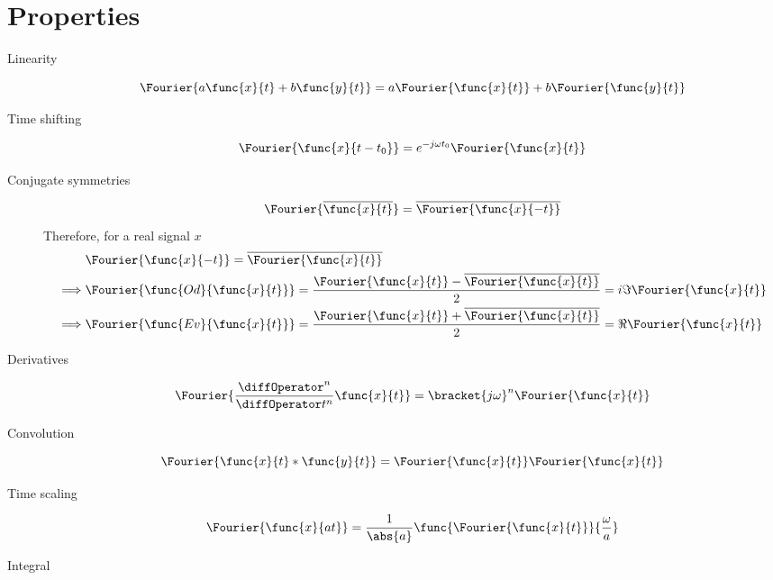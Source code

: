 \section{Properties}
\begin{description}
    \item[Linearity]
    \begin{equation*}
        \Fourier{a \func{x}{t} + b \func{y}{t}} = a \Fourier{\func{x}{t}} + b \Fourier{\func{y}{t}}
    \end{equation*}
    \item[Time shifting]
    \begin{equation*}
        \Fourier{\func{x}{t - t_0}} = e^{-j\omega t_0} \Fourier{\func{x}{t}}
    \end{equation*}
    \item[Conjugate symmetries]
    \begin{equation*}
        \Fourier{\overline{\func{x}{t}}} = \overline{\Fourier{\func{x}{-t}}}    
    \end{equation*}
    Therefore, for a real signal \(x\) 
    \begin{align*}
        & \Fourier{\func{x}{-t}} = \overline{\Fourier{\func{x}{t}}}\\
        \implies & \Fourier{\func{Od}{\func{x}{t}}} = \dfrac{\Fourier{\func{x}{t}} - \overline{\Fourier{\func{x}{t}}}}{2} = i \Im \Fourier{\func{x}{t}}\\
        \implies &  \Fourier{\func{Ev}{\func{x}{t}}} = \dfrac{\Fourier{\func{x}{t}} + \overline{\Fourier{\func{x}{t}}}}{2} = \Re \Fourier{\func{x}{t}}\\
    \end{align*}
    \item[Derivatives]
    \begin{equation*}
        \Fourier{\dfrac{\diffOperator^n}{\diffOperator t^n} \func{x}{t}} = \bracket{j\omega}^n \Fourier{\func{x}{t}}
    \end{equation*}
    \item[Convolution]
    \begin{equation*}
        \Fourier{\func{x}{t} \ast \func{y}{t}} = \Fourier{\func{x}{t}} \Fourier{\func{x}{t}}
    \end{equation*}
    \item[Time scaling]
    \begin{equation*}
        \Fourier{\func{x}{at}} =\dfrac{1}{\abs{a}} \func{\Fourier{\func{x}{t}}}{\dfrac{\omega}{a}}
    \end{equation*}
    \item[Integral]

\end{description}
